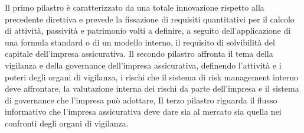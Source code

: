 Il primo pilastro è caratterizzato da una totale innovazione rispetto alla precedente direttiva e prevede la fissazione di requisiti quantitativi per il calcolo di attività, passività e patrimonio volti a definire, a seguito dell’applicazione di una formula standard o di un modello interno, il requisito di solvibilità del capitale dell’impresa assicurativa. 
Il secondo pilastro affronta il tema della vigilanza e della governance dell’impresa assicurativa, definendo l’attività e i poteri degli organi di vigilanza, i rischi che il sistema di risk management interno deve affrontare, la valutazione interna dei rischi da parte dell’impresa e il sistema di governance che l’impresa può adottare,
Il terzo pilastro riguarda il flusso informativo che l’impresa assicurativa deve dare sia al mercato sia quella nei confronti degli organi di vigilanza.

